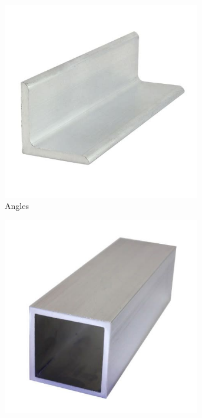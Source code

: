   \begin{figure}[H]
	\begin{subfigure}[b]{.19\linewidth}
		\includegraphics[width=0.95\textwidth]{imgs/extrusion_angle.jpeg}
		\caption{Angles}
	\end{subfigure} \begin{subfigure}[b]{.19\linewidth}
		\includegraphics[width=0.95\textwidth]{imgs/extrusion_boxtube.jpeg}

\end{subfigure}
\end{figure}
